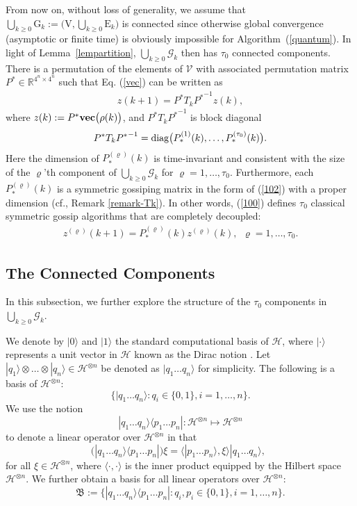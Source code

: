 \documentclass[a4paper, 11pt]{article}
\begin{document}
\medskip

{From now on,  without loss of generality, we} assume that   $\bigcup_{k\geq 0}\mathrm{G}_k:= \Big(\mathrm{V}, \bigcup_{k\geq 0}\mathrm{E}_k \Big)$ is connected since otherwise global convergence (asymptotic or finite time) is {obviously} impossible for Algorithm~(\ref{quantum}).  In light of Lemma~\ref{lempartition}, $\bigcup_{k\geq 0}\mathcal{G}_k$ then has $\tau_0$ connected components. There is a permutation of {the elements of $\mathcal{V}$ with associated permutation matrix} ${P^\ast}\in \mathbb{R}^{4^n \times 4^n}$ such that  Eq. (\ref{vec}) can be written as
\begin{align}\label{100}
z(k+1)= {P^\ast} T_k {P^\ast}^{-1} z(k),
\end{align}
where $z(k):= {P^\ast}{\rm \bf vec}\big(\rho(k)\big)$,  and ${P^\ast} T_k {P^\ast}^{-1}$ is {block diagonal}
$$
{P^\ast} T_k {P^\ast}^{-1}={\rm diag} \big(P_\ast^{(1)}(k),\dots,P_\ast ^{(\tau_0)}(k)\big).
$$
Here the dimension of $P_\ast^{(\varrho)}(k)$ is time-invariant and consistent with the size of the $\varrho$'th component of $\bigcup_{k\geq 0}\mathcal{G}_k$ for $\varrho=1,\dots,\tau_0$.  {Furthermore,} each $ P_\ast^{(\varrho)}(k)$ is  a symmetric gossiping matrix in the form of (\ref{102}) with a proper dimension (cf., Remark \ref{remark-Tk}). In other words, (\ref{100}) defines $\tau_0$  classical symmetric  gossip algorithms that are completely decoupled:
\begin{align}\label{101}
z^{(\varrho)}(k+1)=  P_\ast^{(\varrho)}(k) z^{(\varrho)}(k),\ \ \varrho=1,\dots,\tau_0.
\end{align}


\subsection{The Connected Components}
In this subsection, we further explore the structure of the $\tau_0$ components in $\bigcup_{k\geq 0}\mathcal{G}_k$.

We denote by $|0\rangle$ and $|1\rangle$ the standard  computational basis of $\mathcal{H}$, where $|\cdot \rangle$ represents a unit vector in $\mathcal{H}$ known as the Dirac notion \cite{Nielsen}. Let $|q_1\rangle\otimes \dots \otimes |q_n\rangle \in \mathcal{H}^{\otimes n}$ be denoted as $|q_1 \dots q_n\rangle$ for simplicity. The following is a basis of $\mathcal{H}^{\otimes n}$:
$$
\Big\{|q_1 \dots q_n\rangle: q_i\in\{0,1\}, i=1,\dots,n \Big\}.
$$
We use the notion \cite{Nielsen}
$$
|q_1 \dots q_n\rangle \langle p_1 \dots p_n|:\mathcal{H}^{\otimes n} \mapsto \mathcal{H}^{\otimes n}
$$
to denote a linear operator over $\mathcal{H}^{\otimes n}$ in that
$$
\Big( |q_1 \dots q_n\rangle \langle p_1 \dots p_n|\Big) \xi= \Big \langle  |p_1 \dots p_n\rangle, \xi \Big\rangle |q_1 \dots q_n\rangle, \ \
$$
for all  $\xi\in \mathcal{H}^{\otimes n}$, where $\big \langle \cdot, \cdot \big\rangle$ is the inner product equipped by the Hilbert space $\mathcal{H}^{\otimes n}$. We further obtain a basis for all linear operators over $\mathcal{H}^{\otimes n}$:
$$
\mathfrak{B}:=\Big\{|q_1 \dots q_n\rangle \langle p_1 \dots p_n|:  q_i, p_i\in\{0,1\}, i=1,\dots,n \Big\}.
$$
\end{document}
